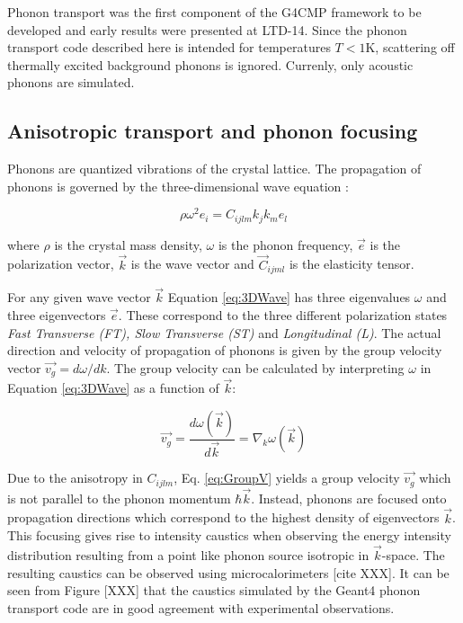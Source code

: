 \documentclass[preprint,12pt]{elsarticle}
\begin{document}
Phonon transport was the first component of the G4CMP framework to be developed and early results were presented at LTD-14. Since the phonon transport code described here is intended for temperatures $T<1$K, scattering off thermally excited background phonons is ignored. Currenly, only acoustic phonons are simulated.

\subsection{Anisotropic transport and phonon focusing}
\label{sec:Focusing}

Phonons are quantized vibrations of the crystal lattice. The propagation of phonons is governed by the three-dimensional wave equation \cite{Wolfe}:

\begin{equation}
\label{eq:3DWave}
\rho \omega ^2e_i=C_{ijlm}k_jk_me_l
\end{equation}

where $\rho$ is the crystal mass density, $\omega$ is the phonon frequency, $\vec{e}$ is the polarization vector, $\vec{k}$ is the wave vector and $\vec{C}_{ijml}$ is the elasticity tensor.

For any given wave vector $\vec{k}$ Equation \ref{eq:3DWave} has three eigenvalues $\omega$ and three eigenvectors $\vec{e}$. These correspond to the three different polarization states \textit{Fast Transverse (FT), Slow Transverse (ST)} and \textit{Longitudinal (L)}. The actual direction and velocity of propagation of phonons is given by the group velocity vector $\vec{v_g} = d\omega/dk$. The group velocity can be calculated by interpreting $\omega$ in Equation \eqref{eq:3DWave} as a function of $\vec{k}$:

\begin{equation}
\label{eq:GroupV}
\vec{v_g}=\frac{d \omega (\vec{k})}{d\vec{k}}=\nabla_k \omega (\vec{k})
\end{equation}

Due to the anisotropy in $C_{ijlm}$, Eq. \eqref{eq:GroupV} yields a group velocity $\vec{v_g}$ which is not parallel to the phonon momentum $\hbar\vec{k}$. Instead, phonons are focused onto propagation directions which correspond to the highest density of eigenvectors $\vec{k}$. This focusing gives rise to intensity caustics when observing the energy intensity distribution resulting from a point like phonon source isotropic in $\vec{k}$-space. The resulting caustics can be observed using microcalorimeters [cite XXX]. It can be seen from Figure [XXX] that the caustics simulated by the Geant4 phonon transport code are in good agreement with experimental observations. 
\end{document}
